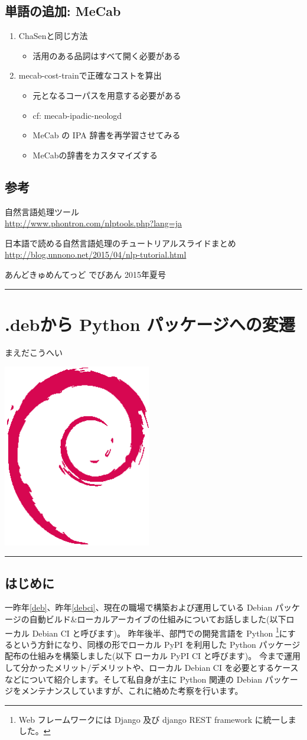 \documentclass[mingoth,a4paper]{jsarticle}
\renewcommand{\dancersection}[2]{%
\newpage
あんどきゅめんてっど でびあん 2015年夏号
%
\vspace{0.1mm}\\
{\color{dancerdarkblue}\rule{\hsize}{2mm}}

%
%
\begin{minipage}[t]{0.6\hsize}
\color{dancerdarkblue}
\vspace{1cm}
\section{#1}
\hfill{}#2\\
\end{minipage}
\begin{minipage}[t]{0.4\hsize}
\vspace{-2cm}
\hfill{}\includegraphics[height=8cm]{image200502/openlogo-nd.eps}\\
\vspace{-5cm}
\end{minipage}
%
{\color{dancerlightblue}\rule{0.66\hsize}{2mm}}
%
\vspace{2cm}
}
\begin{document}
\subsection{単語の追加: MeCab}

\begin{enumerate}
\item ChaSenと同じ方法
  \begin{itemize}
  \item 活用のある品詞はすべて開く必要がある
  \end{itemize}
\item mecab-cost-trainで正確なコストを算出
  \begin{itemize}
  \item 元となるコーパスを用意する必要がある
  \item cf: mecab-ipadic-neologd
  \item MeCab の IPA 辞書を再学習させてみる
  \item MeCabの辞書をカスタマイズする
  \end{itemize}
\end{enumerate}

\subsection{参考}

 自然言語処理ツール\\
\url{http://www.phontron.com/nlptools.php?lang=ja}

 日本語で読める自然言語処理のチュートリアルスライドまとめ\\
\url{http://blog.unnono.net/2015/04/nlp-tutorial.html}

\dancersection{.debから Python パッケージへの変遷}{まえだこうへい}
\subsection{はじめに}

一昨年\ref{deb}、昨年\ref{debci}、現在の職場で構築および運用している Debian パッケージの自動ビルド\&ローカルアーカイブの仕組みについてお話しました(以下ローカル Debian CI と呼びます)。
昨年後半、部門での開発言語を Python \footnote{Web フレームワークには Django 及び django REST framework に統一しました。}にするという方針になり、同様の形でローカル PyPI を利用した Python パッケージ配布の仕組みを構築しました(以下 ローカル PyPI CI と呼びます)。
今まで運用して分かったメリット/デメリットや、ローカル Debian CI を必要とするケースなどについて紹介します。そして私自身が主に Python 関連の Debian パッケージをメンテナンスしていますが、これに絡めた考察を行います。
\end{document}

